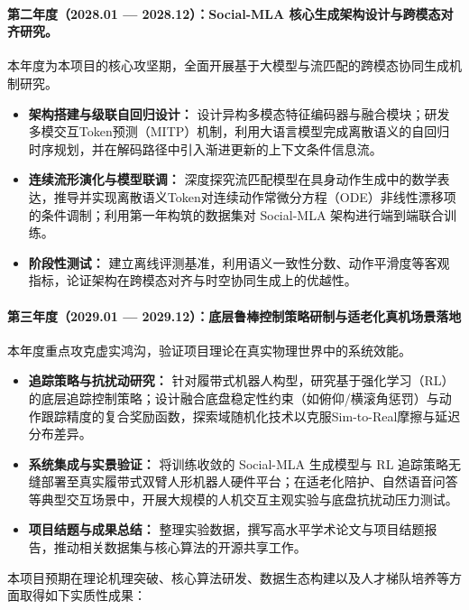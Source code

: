 \paragraph{\textbf{第二年度（2028.01 --- 2028.12）：Social-MLA 核心生成架构设计与跨模态对齐研究。}}
本年度为本项目的核心攻坚期，全面开展基于大模型与流匹配的跨模态协同生成机制研究。
\begin{itemize}
    \item \textbf{架构搭建与级联自回归设计：} 设计异构多模态特征编码器与融合模块；研发多模交互Token预测（MITP）机制，利用大语言模型完成离散语义的自回归时序规划，并在解码路径中引入渐进更新的上下文条件信息流。
    \item \textbf{连续流形演化与模型联调：} 深度探究流匹配模型在具身动作生成中的数学表达，推导并实现离散语义Token对连续动作常微分方程（ODE）非线性漂移项的条件调制；利用第一年构筑的数据集对 Social-MLA 架构进行端到端联合训练。
    \item \textbf{阶段性测试：} 建立离线评测基准，利用语义一致性分数、动作平滑度等客观指标，论证架构在跨模态对齐与时空协同生成上的优越性。
\end{itemize}

\paragraph{\textbf{第三年度（2029.01 --- 2029.12）：底层鲁棒控制策略研制与适老化真机场景落地}}
本年度重点攻克虚实鸿沟，验证项目理论在真实物理世界中的系统效能。
\begin{itemize}
    \item \textbf{追踪策略与抗扰动研究：} 针对履带式机器人构型，研究基于强化学习（RL）的底层追踪控制策略；设计融合底盘稳定性约束（如俯仰/横滚角惩罚）与动作跟踪精度的复合奖励函数，探索域随机化技术以克服Sim-to-Real摩擦与延迟分布差异。
    \item \textbf{系统集成与实景验证：} 将训练收敛的 Social-MLA 生成模型与 RL 追踪策略无缝部署至真实履带式双臂人形机器人硬件平台；在适老化陪护、自然语音问答等典型交互场景中，开展大规模的人机交互主观实验与底盘抗扰动压力测试。
    \item \textbf{项目结题与成果总结：} 整理实验数据，撰写高水平学术论文与项目结题报告，推动相关数据集与核心算法的开源共享工作。
\end{itemize}


本项目预期在理论机理突破、核心算法研发、数据生态构建以及人才梯队培养等方面取得如下实质性成果：

